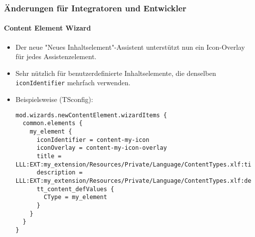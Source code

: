 %

\begin{frame}[fragile]
	\frametitle{Änderungen für Integratoren und Entwickler}
	\framesubtitle{Content Element Wizard}


	\begin{itemize}
		\item Der neue "Neues Inhaltselement"-Assistent unterstützt nun ein Icon-Overlay für
			jedes Assistenzelement.
		\item Sehr nützlich für benutzerdefinierte Inhaltselemente, die denselben
			\texttt{iconIdentifier} mehrfach verwenden.
		\item Beispielsweise (TSconfig):
\begin{lstlisting}
mod.wizards.newContentElement.wizardItems {
  common.elements {
    my_element {
      iconIdentifier = content-my-icon
      iconOverlay = content-my-icon-overlay
      title = LLL:EXT:my_extension/Resources/Private/Language/ContentTypes.xlf:title
      description = LLL:EXT:my_extension/Resources/Private/Language/ContentTypes.xlf:description
      tt_content_defValues {
        CType = my_element
      }
    }
  }
}
\end{lstlisting}

	\end{itemize}

\end{frame}

